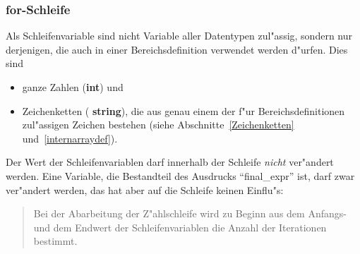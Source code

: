 \subsubsection{{\bf for}-Schleife}
\label{forloop}

\begin{center}
\end{center}

Als Schleifenvariable sind nicht
Variable aller Datentypen zul"assig, sondern nur derjenigen, die auch
in einer Bereichsdefinition verwendet werden d"urfen. Dies sind

\begin{itemize}
  \item ganze Zahlen ({\bf int}) und
  \item Zeichenketten ({\bf
	string}), die aus genau einem der f"ur Bereichsdefinitionen zul"assigen 
	Zeichen bestehen (siehe Abschnitte~\ref{Zeichenketten} und~\ref{internarraydef}).
\end{itemize}

Der Wert der Schleifenvariablen
darf innerhalb der Schleife {\it nicht\/} ver"andert werden. Eine
Variable, die Bestandteil des Ausdrucks ``final\_expr'' ist, darf zwar
ver"andert werden, das hat aber auf die Schleife keinen Einflu"s:

\begin{quote}
  Bei der Abarbeitung der Z"ahlschleife wird zu Beginn aus dem Anfangs- und dem Endwert der
  Schleifenvariablen die Anzahl
der Iterationen bestimmt. 
\end{quote}

